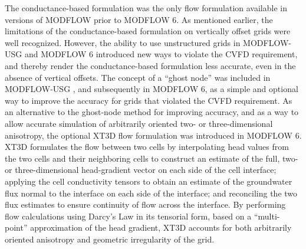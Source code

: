 \documentclass{article}
\begin{document}
The conductance-based formulation was the only flow formulation available in versions of MODFLOW prior to MODFLOW 6. As mentioned earlier, the limitations of the conductance-based formulation on vertically offset grids were well recognized. However, the ability to use unstructured grids in MODFLOW-USG and MODFLOW 6 introduced new ways to violate the CVFD requirement, and thereby render the conductance-based formulation less accurate, even in the absence of vertical offsets. The concept of a ``ghost node'' was included in MODFLOW-USG \citep{modflowusg}, and subsequently in MODFLOW 6, as a simple and optional way to improve the accuracy for grids that violated the CVFD requirement.  As an alternative to the ghost-node method for improving accuracy, and as a way to allow accurate simulation of arbitrarily oriented two- or three-dimensional anisotropy, the optional XT3D flow formulation \citep{modflow6xt3d} was introduced in MODFLOW 6.  XT3D formulates the flow between two cells by interpolating head values from the two cells and their neighboring cells to construct an estimate of the full, two- or three-dimensional head-gradient vector on each side of the cell interface; applying the cell conductivity tensors to obtain an estimate of the groundwater flux  normal to the interface on each side of the interface; and reconciling the two flux estimates to ensure continuity of flow across the interface. By performing flow calculations using Darcy's Law in its tensorial form, based on a ``multi-point'' approximation of the head gradient, XT3D accounts for both arbitrarily oriented anisotropy and geometric irregularity of the grid.
\end{document}
